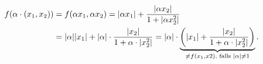 \documentclass[german,12pt]{homework}
\DeclarePairedDelimiter{\absolute}{\lvert}{\rvert}
\DeclarePairedDelimiter{\enbrace}{(}{)}
\begin{document}
\begin{enumerate}
        \begin{align*}
            f\enbrace*{\alpha \cdot \enbrace*{x_1, x_2}} &= f\enbrace*{\alpha{x_1}, \alpha{x_2}} = \absolute*{\alpha{x_1}} + \frac{\absolute*{\alpha{x_2}}}{1 + \absolute*{\alpha{x_2^2}}}\\
            &= \absolute*{\alpha}\absolute*{x_1} + \absolute*{\alpha} \cdot \frac{\absolute*{x_2}}{1 + \alpha \cdot \absolute*{x_2^2}} = \absolute*{\alpha} \cdot \underbrace{\enbrace*{\absolute*{x_1} + \frac{\absolute*{x_2}}{1 + \alpha \cdot \absolute*{x_2^2}}}}_{\ne f\enbrace*{x_1, x2}\text{, falls }\absolute*{\alpha} \ne 1}.
        \end{align*}
    \end{enumerate}
\end{document}
